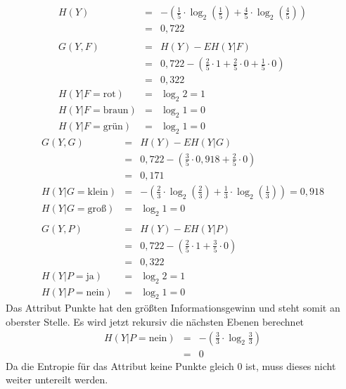 \begin{eqnarray*}
	H(Y)	&=& -(\frac{1}{5} \cdot \log_2(\frac{1}{5}) + \frac{4}{5} \cdot \log_2(\frac{4}{5}))	\\
			&=& 0,722\\\\
	G(Y,F)	&=& H(Y) - E H(Y|F)\\
			&=& 0,722 - (\frac{2}{5} \cdot 1 + \frac{2}{5} \cdot 0 + \frac{1}{5} \cdot 0)			\\
			&=& 0,322\\
	H(Y|F=\textrm{rot})		&=& \log_2 2 = 1\\
	H(Y|F=\textrm{braun})	&=& \log_2 1 = 0\\
	H(Y|F=\textrm{grün})	&=& \log_2 1 = 0
\end{eqnarray*}
\begin{eqnarray*}
	G(Y,G)	&=& H(Y) - E H(Y|G)\\
			&=& 0,722 - (\frac{3}{5} \cdot 0,918 + \frac{2}{5} \cdot 0)			\\
			&=& 0,171\\
	H(Y|G=\textrm{klein})	&=& -(\frac{2}{3} \cdot \log_2(\frac{2}{3}) + \frac{1}{3}\cdot \log_2(\frac{1}{3})) = 0,918\\	
	H(Y|G=\textrm{groß})	&=& \log_2 1 = 0	\\
	\\
	G(Y,P)	&=& H(Y) - E H(Y|P)\\
			&=& 0,722 - (\frac{2}{5} \cdot 1 + \frac{3}{5} \cdot 0)			\\
			&=& 0,322\\
	H(Y|P=\textrm{ja})	&=& \log_2 2 = 1\\
	H(Y|P=\textrm{nein})	&=& \log_2 1 = 0
\end{eqnarray*}
Das Attribut Punkte hat den größten Informationsgewinn und steht somit an oberster Stelle.
Es wird jetzt rekursiv die nächsten Ebenen berechnet
\begin{eqnarray*}
	H(Y|P=\textrm{nein})		&=& -(\frac{3}{3} \cdot \log_2 \frac{3}{3})	\\
								&=& 0
\end{eqnarray*}
Da die Entropie für das Attribut keine Punkte gleich 0 ist, muss dieses nicht weiter untereilt werden.
